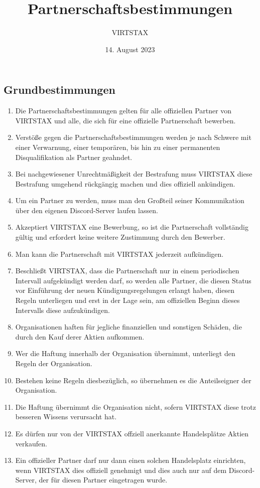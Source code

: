 \documentclass{article}
\title{Partnerschaftsbestimmungen}
\author{VIRTSTAX}
\date{14. August 2023}
\begin{document}
\maketitle
\newpage
\tableofcontents
\newpage
\subsection{Grundbestimmungen}\label{grundb}
\begin{enumerate}[(1)]
	\item Die Partnerschaftsbestimmungen gelten für alle offiziellen Partner von VIRTSTAX und alle, die sich für eine offizielle Partnerschaft bewerben.
	\item Verstöße gegen die Partnerschaftsbestimmungen werden je nach Schwere mit einer Verwarnung, einer temporären, bis hin zu einer permanenten Disqualifikation als Partner geahndet.
	\item Bei nachgewiesener Unrechtmäßigkeit der Bestrafung muss VIRTSTAX diese Bestrafung umgehend rückgängig machen und dies offiziell ankündigen.
	\item Um ein Partner zu werden, muss man den Großteil seiner Kommunikation über den eigenen Discord-Server laufen lassen. 
	\item Akzeptiert VIRTSTAX eine Bewerbung, so ist die Partnerschaft vollständig gültig und erfordert keine weitere Zustimmung durch den Bewerber.
	\item Man kann die Partnerschaft mit VIRTSTAX jederzeit aufkündigen.
	\item Beschließt VIRTSTAX, dass die Partnerschaft nur in einem periodischen Intervall aufgekündigt werden darf, so werden alle Partner, die diesen Status vor Einführung der neuen Kündigungsregelungen erlangt haben, diesen Regeln unterliegen und erst in der Lage sein, am offiziellen Beginn dieses Intervalls diese aufzukündigen.
	\item Organisationen haften für jegliche finanziellen und sonstigen Schäden, die durch den Kauf derer Aktien aufkommen.
	\item Wer die Haftung innerhalb der Organisation übernimmt, unterliegt den Regeln der Organisation.
	\item Bestehen keine Regeln diesbezüglich, so übernehmen es die Anteilseigner der Organisation.
	\item Die Haftung übernimmt die Organisation nicht, sofern VIRTSTAX diese trotz besseren Wissens verursacht hat.
	\item Es dürfen nur von der VIRTSTAX offziell anerkannte Handelsplätze Aktien verkaufen.
	\item Ein offizieller Partner darf nur dann einen solchen Handelsplatz einrichten, wenn VIRTSTAX dies offiziell genehmigt und dies auch nur auf dem Discord-Server, der für diesen Partner eingetragen wurde.
\end{enumerate}
\end{document}
